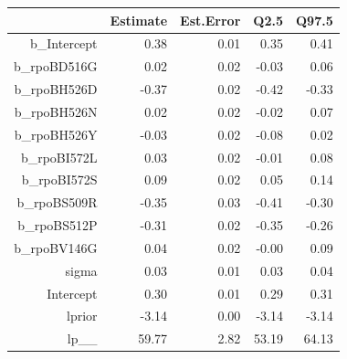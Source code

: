 \begin{table}[ht]
\centering
\begin{tabular}{rrrrr}
  \hline
 & Estimate & Est.Error & Q2.5 & Q97.5 \\ 
  \hline
b\_Intercept & 0.38 & 0.01 & 0.35 & 0.41 \\ 
  b\_rpoBD516G & 0.02 & 0.02 & -0.03 & 0.06 \\ 
  b\_rpoBH526D & -0.37 & 0.02 & -0.42 & -0.33 \\ 
  b\_rpoBH526N & 0.02 & 0.02 & -0.02 & 0.07 \\ 
  b\_rpoBH526Y & -0.03 & 0.02 & -0.08 & 0.02 \\ 
  b\_rpoBI572L & 0.03 & 0.02 & -0.01 & 0.08 \\ 
  b\_rpoBI572S & 0.09 & 0.02 & 0.05 & 0.14 \\ 
  b\_rpoBS509R & -0.35 & 0.03 & -0.41 & -0.30 \\ 
  b\_rpoBS512P & -0.31 & 0.02 & -0.35 & -0.26 \\ 
  b\_rpoBV146G & 0.04 & 0.02 & -0.00 & 0.09 \\ 
  sigma & 0.03 & 0.01 & 0.03 & 0.04 \\ 
  Intercept & 0.30 & 0.01 & 0.29 & 0.31 \\ 
  lprior & -3.14 & 0.00 & -3.14 & -3.14 \\ 
  lp\_\_ & 59.77 & 2.82 & 53.19 & 64.13 \\ 
   \hline
\end{tabular}
\end{table}

